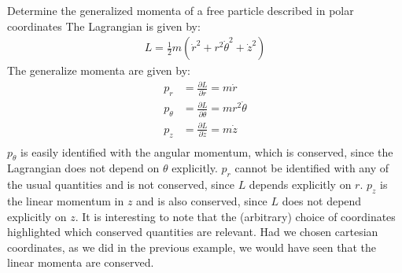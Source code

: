 \begin{example}{0pt}{Determine the generalized momenta of a free particle described in polar coordinates}{}
The Lagrangian is given by:
\begin{align*}
L=\frac{1}{2}m(\dot{r}^2+r^2\dot{\theta}^2+\dot{z}^2)
\end{align*}
The generalize momenta are given by:
\begin{align*}
p_r&=\frac{\partial L}{\partial \dot{r}}=m\dot{r}\\
p_\theta&=\frac{\partial L}{\partial \dot{\theta}}=mr^2\dot{\theta}\\
p_z&=\frac{\partial L}{\partial \dot{z}}=m\dot{z}\\
\end{align*}
$p_\theta$ is easily identified with the angular momentum, which is conserved, since the Lagrangian does not depend on $\theta$ explicitly. $p_r$ cannot be identified with any of the usual quantities and is not conserved, since $L$ depends explicitly on $r$. $p_z$ is the linear momentum in $z$ and is also conserved, since $L$ does not depend explicitly on $z$. It is interesting to note that the (arbitrary) choice of coordinates highlighted which conserved quantities are relevant. Had we chosen cartesian coordinates, as we did in the previous example, we would have seen that the linear momenta are conserved.
\label{ex:polarmomentum}
\end{example}

